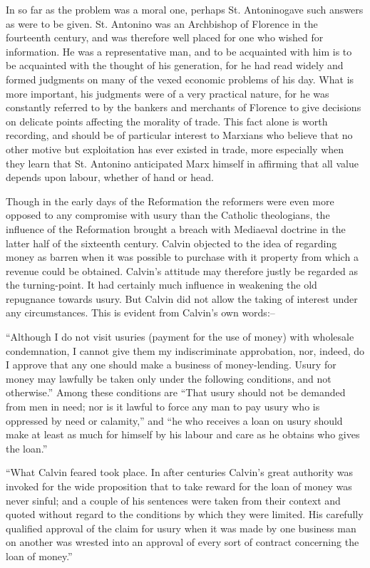 \documentclass{book}
\begin{document}
In so far as the problem was a moral one, perhaps St. Antonino\footnotemark[8] gave such answers as were to be given. St. Antonino was an Archbishop of Florence in the fourteenth century, and was therefore well placed for one who wished for information. He was a representative man, and to be acquainted with him is to be acquainted with the thought of his generation, for he had read widely and formed judgments on many of the vexed economic problems of his day. What is more important, his judgments were of a very practical nature, for he was constantly referred to by the bankers and merchants of Florence to give decisions on delicate points affecting the morality of trade. This fact alone is worth recording, and should be of particular interest to Marxians who believe that no other motive but exploitation has ever existed in trade, more especially when they learn that St. Antonino anticipated Marx himself in affirming that all value depends upon labour, whether of hand or head.

Though in the early days of the Reformation the reformers were even more opposed to any compromise with usury than the Catholic theologians, the influence of the Reformation brought a breach with Mediaeval doctrine in the latter half of the sixteenth century. Calvin objected to the idea of regarding money as barren when it was possible to purchase with it property from which a revenue could be obtained. Calvin’s attitude may therefore justly be regarded as the turning-point. It had certainly much influence in weakening the old repugnance towards usury. But Calvin did not allow the taking of interest under any circumstances. This is evident from Calvin’s own words:–

“Although I do not visit usuries (payment for the use of money) with wholesale condemnation, I cannot give them my indiscriminate approbation, nor, indeed, do I approve that any one should make a business of money-lending. Usury for money may lawfully be taken only under the following conditions, and not otherwise.” Among these conditions are “That usury should not be demanded from men in need; nor is it lawful to force any man to pay usury who is oppressed by need or calamity,” and “he who receives a loan on usury should make at least as much for himself by his labour and care as he obtains who gives the loan.”\footnotemark[9]

“What Calvin feared took place. In after centuries Calvin’s great authority was invoked for the wide proposition that to take reward for the loan of money was never sinful; and a couple of his sentences were taken from their context and quoted without regard to the conditions by which they were limited. His carefully qualified approval of the claim for usury when it was made by one business man on another was wrested into an approval of every sort of contract concerning the loan of money.”\footnotemark[10]
\end{document}
